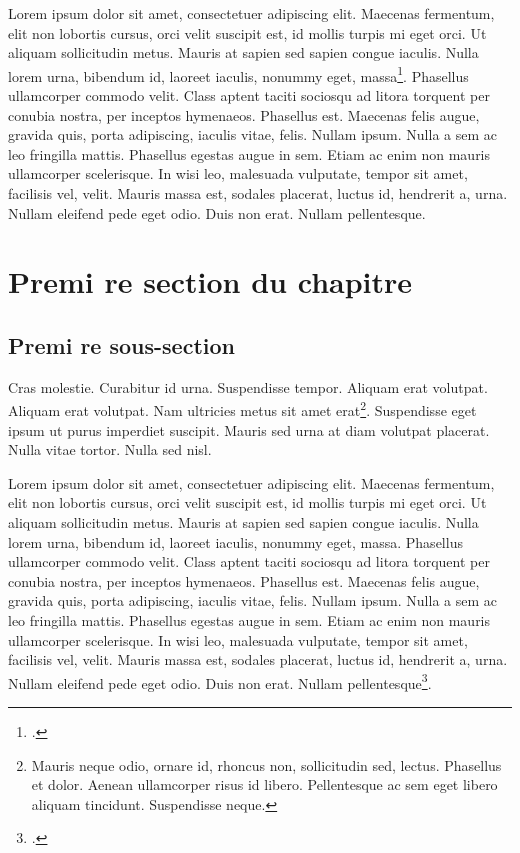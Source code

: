 \documentclass{article}
\begin{document}
Lorem ipsum dolor sit amet, consectetuer adipiscing elit. Maecenas fermentum, elit non lobortis cursus, orci velit suscipit est, id mollis turpis mi eget orci. Ut aliquam sollicitudin metus. Mauris at sapien sed sapien congue iaculis. Nulla lorem urna, bibendum id, laoreet iaculis, nonummy eget, massa\footcite[12]{Pierre1901}. Phasellus ullamcorper commodo velit. Class aptent taciti sociosqu ad litora torquent per conubia nostra, per inceptos hymenaeos. Phasellus est. Maecenas felis augue, gravida quis, porta adipiscing, iaculis vitae, felis. Nullam ipsum. Nulla a sem ac leo fringilla mattis. Phasellus egestas augue in sem. Etiam ac enim non mauris ullamcorper scelerisque. In wisi leo, malesuada vulputate, tempor sit amet, facilisis vel, velit. Mauris massa est, sodales placerat, luctus id, hendrerit a, urna. Nullam eleifend pede eget odio. Duis non erat. Nullam pellentesque. 

\section{Premi re section du chapitre}

\subsection{Premi re sous-section}

Cras molestie. Curabitur id urna. Suspendisse tempor. Aliquam erat volutpat. Aliquam erat volutpat. Nam ultricies metus sit amet erat\footnote{Mauris neque odio, ornare id, rhoncus non, sollicitudin sed, lectus. Phasellus et dolor. Aenean ullamcorper risus id libero. Pellentesque ac sem eget libero aliquam tincidunt. Suspendisse neque.}. Suspendisse eget ipsum ut purus imperdiet suscipit. Mauris sed urna at diam volutpat placerat. Nulla vitae tortor. Nulla sed nisl.

Lorem ipsum dolor sit amet, consectetuer adipiscing elit. Maecenas fermentum, elit non lobortis cursus, orci velit suscipit est, id mollis turpis mi eget orci. Ut aliquam sollicitudin metus. Mauris at sapien sed sapien congue iaculis. Nulla lorem urna, bibendum id, laoreet iaculis, nonummy eget, massa. Phasellus ullamcorper commodo velit. Class aptent taciti sociosqu ad litora torquent per conubia nostra, per inceptos hymenaeos. Phasellus est. Maecenas felis augue, gravida quis, porta adipiscing, iaculis vitae, felis. Nullam ipsum. Nulla a sem ac leo fringilla mattis. Phasellus egestas augue in sem. Etiam ac enim non mauris ullamcorper scelerisque. In wisi leo, malesuada vulputate, tempor sit amet, facilisis vel, velit. Mauris massa est, sodales placerat, luctus id, hendrerit a, urna. Nullam eleifend pede eget odio. Duis non erat. Nullam pellentesque\footcite[56]{Desfois1998}.
\end{document}
